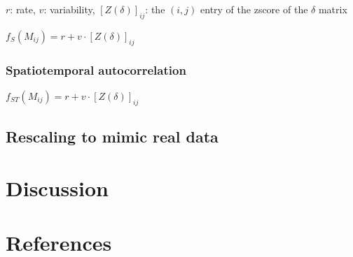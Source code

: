 \documentclass[11pt]{article}
\begin{document}
\(r\): rate, \(v\): variability, \([Z(\delta)]_{ij}\): the \((i,j)\)
entry of the zscore of the \(\delta\) matrix

\(f_{S}(M_{ij}) = r + v \cdot [Z(\delta)]_{ij}\)

\hypertarget{spatiotemporal-autocorrelation}{%
\subsubsection{Spatiotemporal
autocorrelation}\label{spatiotemporal-autocorrelation}}

\(f_{ST}(M_{ij}) = r + v \cdot [Z(\delta)]_{ij}\)

\hypertarget{rescaling-to-mimic-real-data}{%
\subsection{Rescaling to mimic real
data}\label{rescaling-to-mimic-real-data}}

\hypertarget{discussion}{%
\section{Discussion}\label{discussion}}

\hypertarget{references}{%
\section*{References}\label{references}}
\end{document}
